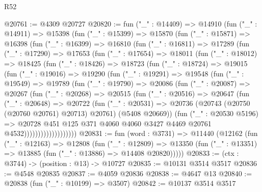 \begin{lexlean}{R52}
\begin{coremodule}
@20761 := @4309 @20727
@20820 := fun ("_" : @14409) =>
  @14910
    (fun ("_" : @14911) =>
    @15398
      (fun ("_" : @15399) =>
      @15870
        (fun ("_" : @15871) =>
        @16398
          (fun ("_" : @16399) =>
          @16810
            (fun ("_" : @16811) =>
            @17289
              (fun ("_" : @17290) =>
              @17653
                (fun ("_" : @17654) =>
                @18011
                  (fun ("_" : @18012) =>
                  @18425
                    (fun ("_" : @18426) =>
                    @18723
                      (fun ("_" : @18724) =>
                      @19015
                        (fun ("_" : @19016) =>
                        @19290
                          (fun ("_" : @19291) =>
                          @19548
                            (fun ("_" : @19549) =>
                            @19789
                              (fun ("_" : @19790) =>
                              @20086
                                (fun ("_" : @20087) =>
                                @20267
                                  (fun ("_" : @20268) =>
                                  @20515
                                    (fun ("_" : @20516) =>
                                    @20647
                                      (fun ("_" : @20648) =>
                                      @20722
                                        (fun ("_" : @20531) =>
                                        @20736
                                          (@20743 (@20750 (@20760 @20761) @20713) @20761)
                                          (@5408 @20669))
                                        (fun ("_" : @20530 @5196) =>
                                        @20728
                                          @451
                                          @125
                                          @371
                                          @4060
                                          @4060
                                          @3427
                                          @4469
                                          @20761
                                          @4532)))))))))))))))))))
@20831 := fun (word : @3731) =>
  @11440
    (@12162
      (fun ("_" : @12163) =>
      @12808
        (fun ("_" : @12809) =>
        @13350 (fun ("_" : @13351) => @13885 (fun ("_" : @13886) => @14408 @20820)))))
@20833 := (ctx : @3744) -> (position : @13) -> @10727
@20835 := @10131 @3514 @3517
@20836 := @4548 @20835
@20837 := @4059 @20836
@20838 := @4647 @13
@20840 := @20838 (fun ("_" : @10199) => @3507)
@20842 := @10137 @3514 @3517

\end{coremodule}
\end{lexlean}
